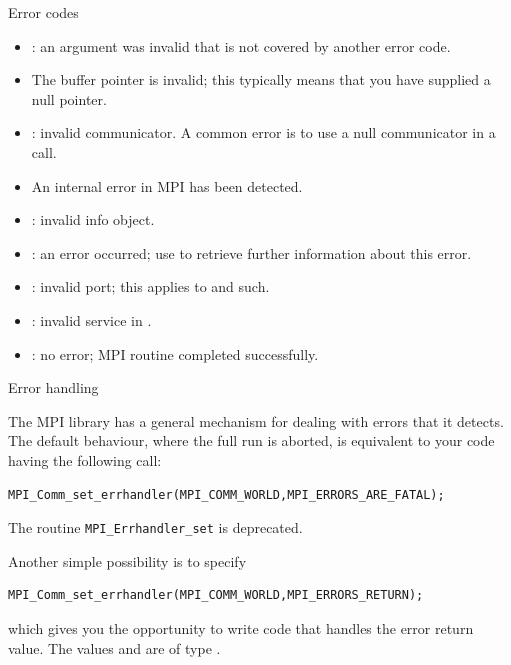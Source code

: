  {Error codes}
\label{sec:mpi-err-codes}

\begin{itemize}
\item {}: an argument was invalid that is not
  covered by another error code.
\item {} The buffer pointer is invalid;
  this typically means that you have supplied a null pointer.
\item {}: 
  invalid communicator. A common error is to use a null communicator in
  a call.
\item {} An internal error in MPI has been detected.
\item {}: 
  invalid info object.
\item {}: an error occurred; use
   to retrieve further information
  about this error.
\item {}: invalid port; this applies to
   and such.
\item {}: invalid service in
  .
\item {}: 
  no error; MPI routine completed successfully.
\end{itemize}

 {Error handling}

The MPI library has a general mechanism for dealing with errors that
it detects. The default behaviour, where the full run is aborted, is
equivalent to your code having the following
call:
\begin{lstlisting}
MPI_Comm_set_errhandler(MPI_COMM_WORLD,MPI_ERRORS_ARE_FATAL);
\end{lstlisting}

\begin{remark}
  The routine
  \lstinline{MPI_Errhandler_set} is deprecated.
\end{remark}

Another simple possibility is to specify
\begin{lstlisting}
MPI_Comm_set_errhandler(MPI_COMM_WORLD,MPI_ERRORS_RETURN);
\end{lstlisting}
which gives you the opportunity to write code that handles the error
return value. The values  and
 are of type .

